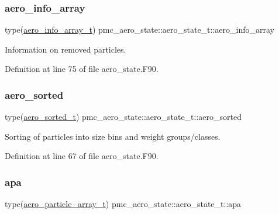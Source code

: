 \subsubsection{\texorpdfstring{aero\+\_\+info\+\_\+array}{aero\_info\_array}}
{\footnotesize\ttfamily type(\mbox{\hyperlink{structpmc__aero__info__array_1_1aero__info__array__t}{aero\+\_\+info\+\_\+array\+\_\+t}}) pmc\+\_\+aero\+\_\+state\+::aero\+\_\+state\+\_\+t\+::aero\+\_\+info\+\_\+array}



Information on removed particles. 



Definition at line 75 of file aero\+\_\+state.\+F90.

\mbox{\label{structpmc__aero__state_1_1aero__state__t_a0a9922991b84778a0f7e6746bb5cd007}} 
\subsubsection{\texorpdfstring{aero\+\_\+sorted}{aero\_sorted}}
{\footnotesize\ttfamily type(\mbox{\hyperlink{structpmc__aero__sorted_1_1aero__sorted__t}{aero\+\_\+sorted\+\_\+t}}) pmc\+\_\+aero\+\_\+state\+::aero\+\_\+state\+\_\+t\+::aero\+\_\+sorted}



Sorting of particles into size bins and weight groups/classes. 



Definition at line 67 of file aero\+\_\+state.\+F90.

\mbox{\label{structpmc__aero__state_1_1aero__state__t_aa8fd1e1c085328e5590a53b78ccd5083}} 
\subsubsection{\texorpdfstring{apa}{apa}}
{\footnotesize\ttfamily type(\mbox{\hyperlink{structpmc__aero__particle__array_1_1aero__particle__array__t}{aero\+\_\+particle\+\_\+array\+\_\+t}}) pmc\+\_\+aero\+\_\+state\+::aero\+\_\+state\+\_\+t\+::apa}



